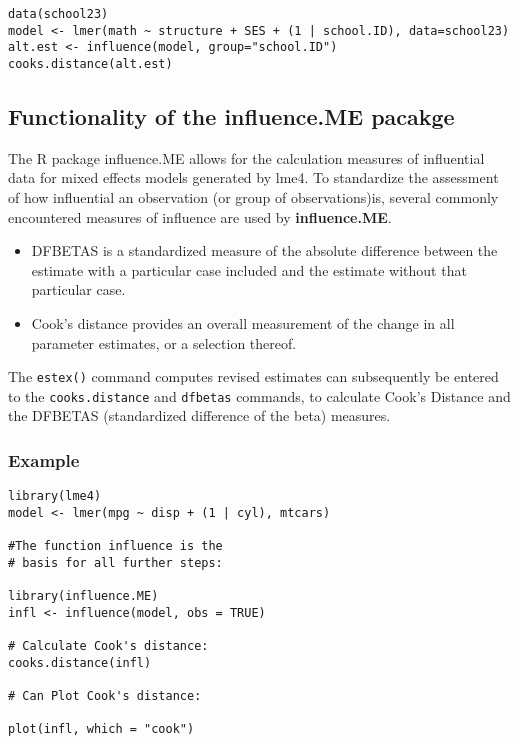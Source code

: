 \documentclass[12pt, a4paper]{article}
\begin{document}
\begin{verbatim}
data(school23)
model <- lmer(math ~ structure + SES + (1 | school.ID), data=school23)
alt.est <- influence(model, group="school.ID")
cooks.distance(alt.est)
\end{verbatim}

\subsection{Functionality of the influence.ME pacakge}
The R package influence.ME allows for the calculation measures of influential data for mixed effects models generated by lme4. To standardize the assessment of how influential an observation (or group of observations)is, several commonly encountered measures
of influence are used by \textbf{influence.ME}.


\begin{itemize}
\item DFBETAS is a standardized measure of the absolute difference
between the estimate with a particular case included and the estimate without that particular
case. 
\item Cook’s distance provides an overall measurement of the change in all parameter
estimates, or a selection thereof.
\end{itemize}

The \texttt{estex()} command computes revised estimates can subsequently
be entered to the \texttt{cooks.distance} and \texttt{dfbetas} commands, to calculate Cook’s Distance
and the DFBETAS (standardized difference of the beta) measures.

\subsubsection*{Example}

\begin{framed}
\begin{verbatim}
library(lme4)
model <- lmer(mpg ~ disp + (1 | cyl), mtcars)

#The function influence is the 
# basis for all further steps:

library(influence.ME)
infl <- influence(model, obs = TRUE)

# Calculate Cook's distance:
cooks.distance(infl)

# Can Plot Cook's distance:

plot(infl, which = "cook")
\end{verbatim}
\end{framed}
\end{document}

